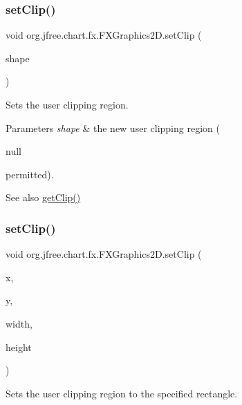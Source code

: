 \subsubsection{\texorpdfstring{set\+Clip()}{setClip()}\hspace{0.1cm}{\footnotesize\ttfamily [1/2]}}
{\footnotesize\ttfamily void org.\+jfree.\+chart.\+fx.\+F\+X\+Graphics2\+D.\+set\+Clip (\begin{DoxyParamCaption}\item[{Shape}]{shape }\end{DoxyParamCaption})}

Sets the user clipping region.


\begin{DoxyParams}{Parameters}
{\em shape} & the new user clipping region (
\begin{DoxyCode}
null 
\end{DoxyCode}
 permitted).\\
\hline
\end{DoxyParams}
\begin{DoxySeeAlso}{See also}
\mbox{\hyperlink{classorg_1_1jfree_1_1chart_1_1fx_1_1_f_x_graphics2_d_adab65fa84e10b25840c2d8af0f2e3356}{get\+Clip()}} 
\end{DoxySeeAlso}
\mbox{\label{classorg_1_1jfree_1_1chart_1_1fx_1_1_f_x_graphics2_d_a36299ed05b4a5a1d2ae8e71cbb347b7d}} 
\subsubsection{\texorpdfstring{set\+Clip()}{setClip()}\hspace{0.1cm}{\footnotesize\ttfamily [2/2]}}
{\footnotesize\ttfamily void org.\+jfree.\+chart.\+fx.\+F\+X\+Graphics2\+D.\+set\+Clip (\begin{DoxyParamCaption}\item[{int}]{x,  }\item[{int}]{y,  }\item[{int}]{width,  }\item[{int}]{height }\end{DoxyParamCaption})}

Sets the user clipping region to the specified rectangle.


